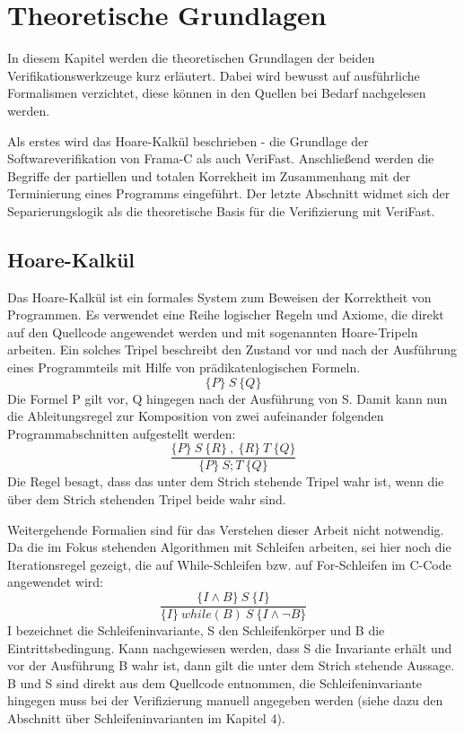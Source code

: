﻿
\chapter{Theoretische Grundlagen}

In diesem Kapitel werden die theoretischen Grundlagen der beiden Verifikationswerkzeuge kurz erläutert. Dabei wird bewusst
auf ausführliche Formalismen verzichtet, diese können in den Quellen bei Bedarf nachgelesen werden.

Als erstes wird das Hoare-Kalkül beschrieben - die Grundlage der Softwareverifikation von Frama-C als auch VeriFast.
Anschließend werden die Begriffe der partiellen und totalen Korrekheit im Zusammenhang mit der Terminierung eines Programms
eingeführt. Der letzte Abschnitt widmet sich der Separierungslogik als die theoretische Basis für die Verifizierung
mit VeriFast.

\section{Hoare-Kalkül}

Das Hoare-Kalkül ist ein formales System zum Beweisen der Korrektheit von Programmen. Es verwendet eine Reihe logischer
Regeln und Axiome, die direkt auf den Quellcode angewendet werden und mit sogenannten Hoare-Tripeln arbeiten. Ein solches
Tripel beschreibt den Zustand vor und nach der Ausführung eines Programmteils mit Hilfe von prädikatenlogischen
Formeln.
\begin{displaymath}
\{P\} \: S \: \{Q\}
\end{displaymath}
Die Formel P gilt vor, Q hingegen nach der Ausführung von S. Damit kann nun die Ableitungsregel zur Komposition von
zwei aufeinander folgenden Programmabschnitten aufgestellt werden:
\begin{displaymath}
\frac{\{P\} \:S\: \{R\} \:, \: \{R\} \: T \: \{Q\}}{\{P\}\: S; T \: \{Q\}}
\end{displaymath}
Die Regel besagt, dass das unter dem Strich stehende Tripel wahr ist, wenn die über dem Strich
stehenden Tripel beide wahr sind.

Weitergehende Formalien sind für das Verstehen dieser Arbeit nicht notwendig. Da die im Fokus stehenden
Algorithmen mit Schleifen arbeiten, sei hier noch die Iterationsregel gezeigt, die auf While-Schleifen
bzw. auf For-Schleifen im C-Code angewendet wird: 
\begin{displaymath}
\frac{\{I \land B\} \:S\: \{I\}}{\{I\}\: while(B)\: S\: \{I \land \neg B\}}
\end{displaymath}
I bezeichnet die Schleifeninvariante, S den Schleifenkörper und B die Eintrittsbedingung. Kann nachgewiesen werden,
dass S die Invariante erhält und vor der Ausführung B wahr ist, dann gilt die unter dem Strich stehende Aussage.
B und S sind direkt aus dem Quellcode entnommen, die Schleifeninvariante hingegen muss bei der Verifizierung 
manuell angegeben werden (siehe dazu den Abschnitt über Schleifeninvarianten im Kapitel 4).

